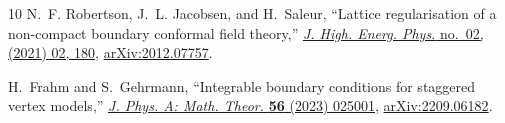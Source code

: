 \documentclass[12pt]{article}
\numberwithin{equation}{section}
\begin{document}
\begin{thebibliography}{10}
		N.~F. Robertson, J.~L. Jacobsen, and H.~Saleur, ``{L}attice regularisation of a
		non-compact boundary conformal field theory,''
		\href{http://dx.doi.org/10.1007/JHEP02(2021)180}{{\em J. High. Energ. Phys.}
			no.~02, (2021) 02, 180}, \href{http://arxiv.org/abs/2012.07757}{{\ttfamily
				arXiv:2012.07757}}.
		
		H.~Frahm and S.~Gehrmann, ``Integrable boundary conditions for staggered vertex
		models,'' \href{http://dx.doi.org/10.1088/1751-8121/acb29f}{{\em J. Phys. A:
				Math. Theor.} {\bfseries 56} (2023) 025001},
		\href{http://arxiv.org/abs/2209.06182}{{\ttfamily arXiv:2209.06182}}.
		
	\end{thebibliography}\endgroup
\end{document}
